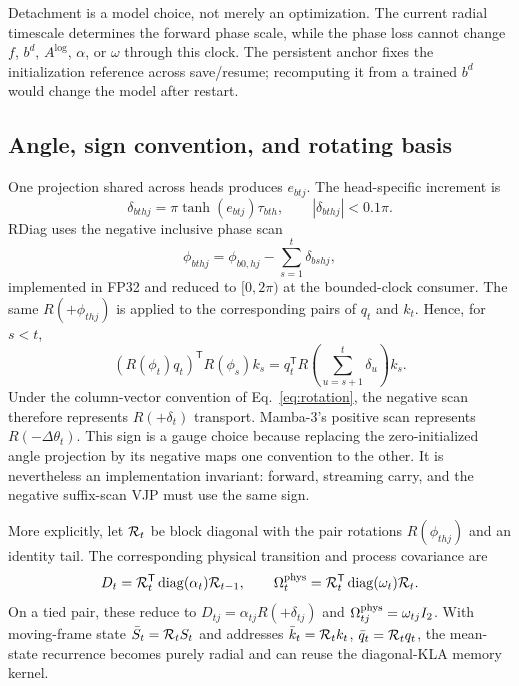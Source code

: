 \documentclass[11pt]{article}
\newcommand{\tr}{\mathsf{T}}
\newcommand{\diag}{\operatorname{diag}}
\begin{document}
Detachment is a model choice, not merely an optimization.  The current radial timescale determines
the forward phase scale, while the phase loss cannot change $f$, $b^d$, $A^{\log}$, $\alpha$, or
$\omega$ through this clock.  The persistent anchor fixes the initialization reference across
save/resume; recomputing it from a trained $b^d$ would change the model after restart.

\subsection{Angle, sign convention, and rotating basis}

One projection shared across heads produces $e_{btj}$.  The head-specific increment is
\begin{equation}
  \delta_{bthj}=\pi\tanh(e_{btj})\tau_{bth},
  \qquad |\delta_{bthj}|<0.1\pi.
  \label{eq:rdiag-delta}
\end{equation}
RDiag uses the negative inclusive phase scan
\begin{equation}
  \phi_{bthj}=\phi_{b0,hj}-\sum_{s=1}^{t}\delta_{bshj},
  \label{eq:negative-phase}
\end{equation}
implemented in FP32 and reduced to $[0,2\pi)$ at the bounded-clock consumer.  The same
$R(+\phi_{thj})$ is applied to the corresponding pairs of $q_t$ and $k_t$.  Hence, for $s<t$,
\begin{equation}
  (R(\phi_t)q_t)^{\tr}R(\phi_s)k_s
  =q_t^{\tr}R\!\left(\sum_{u=s+1}^{t}\delta_u\right)k_s.
  \label{eq:rdiag-relative}
\end{equation}
Under the column-vector convention of Eq.~\eqref{eq:rotation}, the negative scan therefore
represents $R(+\delta_t)$ transport.  Mamba-3's positive scan represents $R(-\Delta\theta_t)$.
This sign is a gauge choice because replacing the zero-initialized angle projection by its negative
maps one convention to the other.  It is nevertheless an implementation invariant: forward,
streaming carry, and the negative suffix-scan VJP must use the same sign.

More explicitly, let ${\cal R}_t$ be block diagonal with the pair rotations $R(\phi_{thj})$ and an
identity tail.  The corresponding physical transition and process covariance are
\begin{equation}
  D_t={\cal R}_t^{\tr}\diag(\alpha_t){\cal R}_{t-1},
  \qquad
  \Omega_t^{\rm phys}={\cal R}_t^{\tr}\diag(\omega_t){\cal R}_t.
  \label{eq:rdiag-physical}
\end{equation}
On a tied pair, these reduce to $D_{tj}=\alpha_{tj}R(+\delta_{tj})$ and
$\Omega_{tj}^{\rm phys}=\omega_{tj}I_2$.  With moving-frame state
$\bar S_t={\cal R}_t S_t$ and addresses
$\bar k_t={\cal R}_tk_t$, $\bar q_t={\cal R}_tq_t$, the mean-state recurrence becomes purely
radial and can reuse the diagonal-KLA memory kernel.
\end{document}
